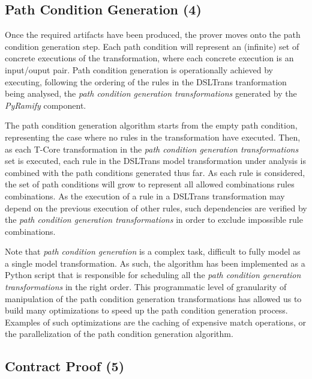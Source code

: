\subsection{Path Condition Generation (4)}
\label{sec:path_cond_gen}

Once the required artifacts have been produced, the prover moves onto the path
condition generation step. Each path condition will represent an (infinite) set
of concrete executions of the transformation, where each concrete execution is an
input/ouput pair. Path condition generation is operationally achieved by
executing, following the ordering of the rules in the DSLTrans
tranformation being analysed, the \emph{path condition generation transformations} generated by the
\emph{PyRamify} component. 

The path condition generation algorithm starts from the empty path condition,
representing the case where no rules in the transformation have executed. Then,
as each T-Core transformation in the \emph{path condition generation
transformations} set is executed, each rule in the DSLTrans model transformation
under analysis is combined with the path conditions generated thus far. As each
rule is considered, the set of path conditions will grow
to represent all allowed combinations rules combinations. As the execution of a
rule in a DSLTrans transformation may depend on the previous execution of other rules,
such dependencies are verified by the \emph{path condition generation
transformations} in order to exclude impossible rule combinations.


Note that \emph{path condition generation} is a complex task, difficult to fully
model as a single model transformation. As such, the algorithm
has been implemented as a Python script that is responsible for scheduling all the
\emph{path condition generation transformations} in the right order. This programmatic level of granularity of
manipulation of the path condition generation transformations has allowed us to
build many optimizations to speed up the path condition generation process.
Examples of such optimizations are the caching of expensive match operations, or
the parallelization of the path condition generation algorithm. 

\subsection{Contract Proof (5)}

